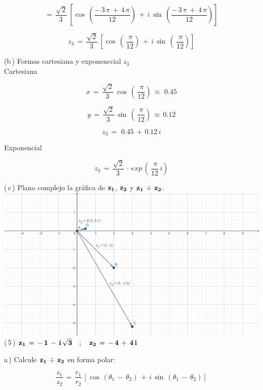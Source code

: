 \documentclass[a4paper,11pt,openany]{book}
\begin{document}
$$=\,\dfrac{\sqrt{2}}{3\,}\,\left[\cos\,\left(\dfrac{-\,3\,\pi\,+\,4\,\pi}{12}\right)\,+\,i\,\sin\,\left(\dfrac{-\,3\,\pi\,+\,4\,\pi}{12}\right)\right]$$

$$z_{3}\,=\,\dfrac{\sqrt{2}}{3\,}\,\left[\cos\,\left(\,\dfrac{\,\pi}{12}\right)\,+\,i\,\sin\,\left(\,\dfrac{\,\pi}{12}\right)\right]$$

\textcolor{ao(english)}{(b\,)} Formas cartesiana y exponenccial $z_{3}$\\

\textcolor{ao(english)}{} Cartesiana

$$x\,=\,\dfrac{\sqrt{2}}{3\,}\,\cos\,\left(\,\dfrac{\,\pi}{12}\right)\,\approx\,\,0.45$$

$$y\,=\,\dfrac{\sqrt{2}}{3\,}\,\sin\,\left(\,\dfrac{\pi}{12}\right)\,\approx\,0.12$$

$$z_{3}\,=\,\,0.45\,+\,0.12\,i$$

\textcolor{ao(english)}{} Exponencial

$$z_{3}\,=\,\dfrac{\sqrt{2}}{3\,}\,\cdot\,exp\,\left(\,\dfrac{\,\pi}{12}\,i\right)$$


\textcolor{ao(english)}{(\,c\,)} Plano complejo la gráfica de $\bf{z_{1}}$, $\bf{z_{2}}$ y $\bf{z_{1}\,\div\,z_{2}}$.\\

\includegraphics[width=15cm]{Gra-Ej-4.}\\

\textcolor{ao(english)}{(\,5\,)} $\bf{z_{1}\,=\,-\,1\,-\,i\,\sqrt{3} \quad;\quad z_{2}\,=\,-\,4\,+\,4\,i}$

\textcolor{ao(english)}{a\,)} Calcule $\bf{z_{1}\,\div\,z_{2}}$ en forma polar:

$$\dfrac{z_{1}}{z_{2}}\,=\,\dfrac{r_{1}}{r_{2}}\,\left[\cos\,(\theta_{1}\,-\,\theta_{2})\,+\,i\,\sin\,(\theta_{1}\,-\,\theta_{2})\right]$$
\end{document}

